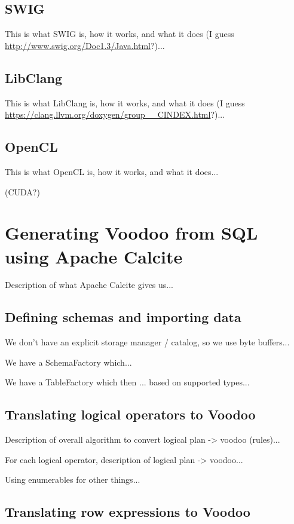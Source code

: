 \subsection{SWIG}

This is what SWIG is, how it works, and what it does (I guess \url{http://www.swig.org/Doc1.3/Java.html}?)...

\subsection{LibClang}

This is what LibClang is, how it works, and what it does (I guess \url{https://clang.llvm.org/doxygen/group__CINDEX.html}?)...

\subsection{OpenCL}

This is what OpenCL is, how it works, and what it does...

(CUDA?)

\section{Generating Voodoo from SQL using Apache Calcite}

Description of what Apache Calcite gives us...

\subsection{Defining schemas and importing data}

We don't have an explicit storage manager / catalog, so we use byte buffers...

We have a SchemaFactory which...

We have a TableFactory which then ... based on supported types...

\subsection{Translating logical operators to Voodoo}

Description of overall algorithm to convert logical plan -> voodoo (rules)...

For each logical operator, description of logical plan -> voodoo...

Using enumerables for other things...

\subsection{Translating row expressions to Voodoo}

